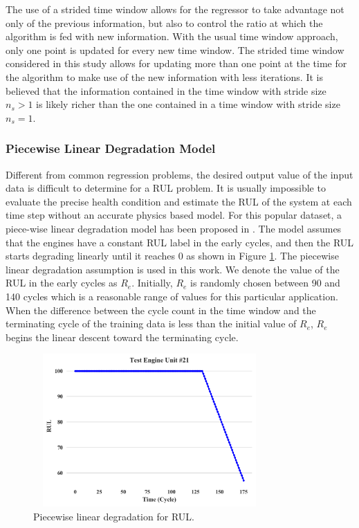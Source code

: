 \documentclass[preprint,12pt]{elsarticle}%
\begin{document}
\pagebreak

The use of a strided time window allows for the regressor to take advantage
not only of the previous information, but also to control the ratio at which
the algorithm is fed with new information. With the usual time window
approach, only one point is updated for every new time window. The strided
time window considered in this study allows for updating more than one point
at the time for the algorithm to make use of the new information with less iterations. It
is believed that the information contained in the time window with stride size
$n_{s}>1$ is likely richer than the one contained in a time window with stride
size $n_{s}=1$.

\subsubsection{Piecewise Linear Degradation Model}

Different from common regression problems, the desired output value of the
input data is difficult to determine for a RUL problem. It is usually
impossible to evaluate the precise health condition and estimate the RUL of
the system at each time step without an accurate physics based model. For this
popular dataset, a piece-wise linear degradation model has been proposed in
\cite{Ramasso2014}. The model assumes that the engines have a constant RUL
label in the early cycles, and then the RUL starts degrading linearly until it
reaches 0 as shown in Figure \ref{FigRULinear}. The piecewise linear
degradation assumption is used in this work. We denote the value of the RUL in
the early cycles as $R_{e}$. Initially,  $R_{e}$ is randomly chosen between 90 and 140 
cycles which is a reasonable range of values for this particular application. When the difference between the cycle count in the time window and the terminating cycle 
of the training data is less than the initial value of $R_{e}$, $R_{e}$ begins the linear 
descent toward the terminating cycle.

\begin{figure}[!htb]
\begin{center}
\includegraphics[height=2.3in, width=3.5in]
{Figures/test_engine.png}
\caption{Piecewise linear degradation for RUL.}
\label{FigRULinear}
\end{center}
\end{figure}
\end{document}
